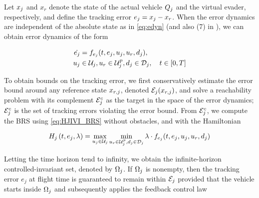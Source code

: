 
Let $x_j$ and $x_r$ denote the state of the actual vehicle $Q_j$ and the virtual evader, respectively, and define the tracking error $e_j=x_j-x_r$. When the error dynamics are independent of the absolute state as in \eqref{eq:edyn} (and also (7) in \cite{Mitchell05}), we can obtain error dynamics of the form

\begin{equation}
\label{eq:edyn} %
\begin{aligned}
\dot{e_j} &= \fdyn_{e_j}(t, e_j, \ctrl_j, \ctrl_r,\dstb_j), \\
\ctrl_j &\in \cset_j, \ctrl_r\in\cset^\pos_j, \dstb_j \in \dset_j, \quad t \in [0, T]
\end{aligned}
\end{equation}

To obtain bounds on the tracking error, we first conservatively estimate the error bound around any reference state $x_{r,j}$, denoted $\mathcal{E}_j(x_{r,j})$, and solve a reachability problem with its complement $\mathcal{E}_j^c$ as the target in the space of the error dynamics; $\mathcal{E}_j^c$ is the set of tracking errors violating the error bound. From $\mathcal{E}_j^c$, we compute the BRS using \eqref{eq:HJIVI_BRS} without obstacles, and with the Hamiltonian

\begin{equation}
\label{eq:HJIVI_track}
\ham_j\left(t, e_j, \costate\right) = \max_{\ctrl_j \in \cset_j} \min_{\ctrl_r \in\cset^\pos_j, \dstb_j \in \dset_j} \costate \cdot \fdyn_{e_j}(t, e_j, \ctrl_j, \ctrl_r,\dstb_j)
\end{equation}

Letting the time horizon tend to infinity, we obtain the infinite-horizon controlled-invariant set, denoted by $\Omega_j$. If $\Omega_j$ is nonempty, then the tracking error $e_j$ at flight time is guaranteed to remain within $\mathcal{E}_j$ provided that the vehicle starts inside $\Omega_j$ and subsequently applies the feedback control law

